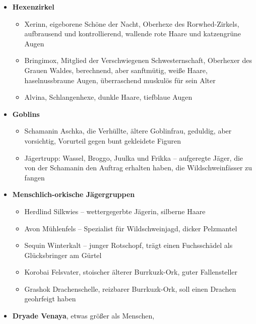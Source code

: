      \begin{itemize}
   	\item \textbf{Hexenzirkel}
                \begin{itemize}
        	\item  Xerinn, eigeborene Schöne der Nacht, Oberhexe des Rorwhed-Zirkels, aufbrausend und kontrollierend, wallende rote Haare und katzengrüne Augen
       \item Bringimox, Mitglied der Verschwiegenen Schwesternschaft, Oberhexer des Grauen Waldes, berechnend, aber sanftmütig, weiße Haare, haselnussbraune Augen, überraschend muskulös für sein Alter
        \item Alvina, Schlangenhexe, dunkle Haare, tiefblaue Augen
        \end{itemize}
    \item \textbf{Goblins}
                \begin{itemize}
        	\item  Schamanin Aschka, die Verhüllte, ältere Goblinfrau, geduldig, aber vorsichtig, Vorurteil gegen bunt gekleidete Figuren
        \item Jägertrupp: Wassel, Broggo, Juulka und Frikka -- aufgeregte Jäger, die von der Schamanin den Auftrag erhalten haben, die Wildschweinfässer zu fangen
        \end{itemize}
    \item \textbf{Menschlich-orkische Jägergruppen}
            \begin{itemize}
    	\item Herdlind Silkwies -- wettergegerbte Jägerin, silberne Haare
        \item Avon Mühlenfels -- Spezialist für Wildschweinjagd, dicker Pelzmantel
        \item Sequin Winterkalt -- junger Rotschopf, trägt einen Fuchsschädel als Glücksbringer am Gürtel
        \item Korobai Felsvater, stoischer älterer Burrkuzk-Ork, guter Fallensteller
        \item Grashok Drachenschelle, reizbarer Burrkuzk-Ork, soll einen Drachen geohrfeigt haben
        \end{itemize}
    \item \textbf{Dryade Venaya}, etwas größer als Menschen, 
    \end{itemize}


